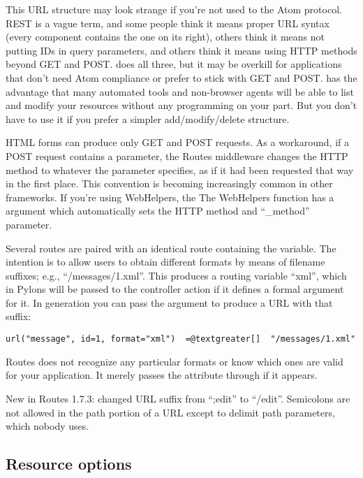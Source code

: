 \documentclass[letterpaper,10pt,english]{manual}
\begin{document}
This URL structure may look strange if you're not used to the Atom protocol.
REST is a vague term, and some people think it means proper URL syntax (every
component contains the one on its right), others think it means not putting IDs
in query parameters, and others think it means using HTTP methods beyond GET
and POST.   does all three, but it may be overkill for
applications that don't need Atom compliance or prefer to stick with GET and
POST.   has the advantage that many automated tools and
non-browser agents will be able to list and modify your resources without any
programming on your part.  But you don't have to use it if you prefer a simpler
add/modify/delete structure.

HTML forms can produce only GET and POST requests.  As a workaround, if a POST
request contains a  parameter, the Routes middleware changes the
HTTP method to whatever the parameter specifies, as if it had been requested
that way in the first place.  This convention is becoming increasingly common
in other frameworks.  If you're using WebHelpers, the The WebHelpers 
function has a  argument which automatically sets the HTTP method and
``\_method'' parameter.

Several routes are paired with an identical route containing the 
variable.  The intention is to allow users to obtain different formats by means
of filename suffixes; e.g., ``/messages/1.xml''.  This produces a routing
variable ``xml'', which in Pylons will be passed to the controller action if it
defines a formal argument for it.  In generation you can pass the 
argument to produce a URL with that suffix:

\begin{Verbatim}[commandchars=@\[\]]
url("message", id=1, format="xml")  =@textgreater[]  "/messages/1.xml"
\end{Verbatim}

Routes does not recognize any particular formats or know which ones are valid
for your application.  It merely passes the  attribute through if it
appears.

New in Routes 1.7.3: changed URL suffix from ``;edit'' to ``/edit''.  Semicolons
are not allowed in the path portion of a URL except to delimit path parameters,
which nobody uses.


\subsection{Resource options}
\end{document}
